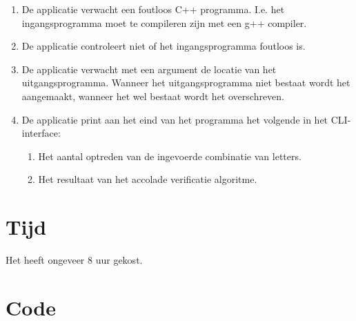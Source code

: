 \documentclass[10pt]{article}
\begin{document}
\begin{enumerate}
      \item De applicatie verwacht een foutloos C++ programma. I.e. het ingangsprogramma moet te compileren zijn met een
            g++ compiler.
      \item De applicatie controleert niet of het ingangsprogramma foutloos is.
      \item De applicatie verwacht met een argument de locatie van het uitgangsprogramma. Wanneer het uitgangsprogramma
            niet bestaat wordt het aangemaakt, wanneer het wel bestaat wordt het overschreven.
      \item De applicatie print aan het eind van het programma het volgende in het CLI-interface: 
      \begin{enumerate}
            \item Het aantal optreden van de ingevoerde combinatie van letters. 
            \item Het resultaat van het accolade verificatie algoritme. 
      \end{enumerate}
\end{enumerate}

\section{Tijd}
Het heeft ongeveer 8 uur gekost.

\section{Code}\label{sec:code}

\end{document}
